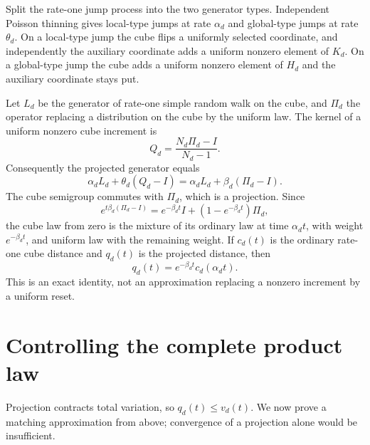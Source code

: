 \documentclass[11pt]{article}
\theoremstyle{remark}\newtheorem{remark}[theorem]{Remark}
\begin{document}
Split the rate-one jump process into the two generator types. Independent Poisson thinning gives local-type jumps at rate $\alpha_d$ and global-type jumps at rate $\theta_d$. On a local-type jump the cube flips a uniformly selected coordinate, and independently the auxiliary coordinate adds a uniform nonzero element of $K_d$. On a global-type jump the cube adds a uniform nonzero element of $H_d$ and the auxiliary coordinate stays put.

Let $L_d$ be the generator of rate-one simple random walk on the cube, and $\Pi_d$ the operator replacing a distribution on the cube by the uniform law. The kernel of a uniform nonzero cube increment is
\[
 Q_d=\frac{N_d\Pi_d-I}{N_d-1}.
\]
Consequently the projected generator equals
\begin{equation}\label{eq:reset}
 \alpha_d L_d+\theta_d(Q_d-I)
 =\alpha_d L_d+\beta_d(\Pi_d-I).
\end{equation}
The cube semigroup commutes with $\Pi_d$, which is a projection. Since
\[
 e^{t\beta_d(\Pi_d-I)}=e^{-\beta_dt}I+(1-e^{-\beta_dt})\Pi_d,
\]
the cube law from zero is the mixture of its ordinary law at time $\alpha_dt$, with weight $e^{-\beta_dt}$, and uniform law with the remaining weight. If $c_d(t)$ is the ordinary rate-one cube distance and $q_d(t)$ is the projected distance, then
\begin{equation}\label{eq:projected}
 q_d(t)=e^{-\beta_dt}c_d(\alpha_dt).
\end{equation}
This is an exact identity, not an approximation replacing a nonzero increment by a uniform reset.

\section{Controlling the complete product law}
Projection contracts total variation, so $q_d(t)\le v_d(t)$. We now prove a matching approximation from above; convergence of a projection alone would be insufficient.
\end{document}
